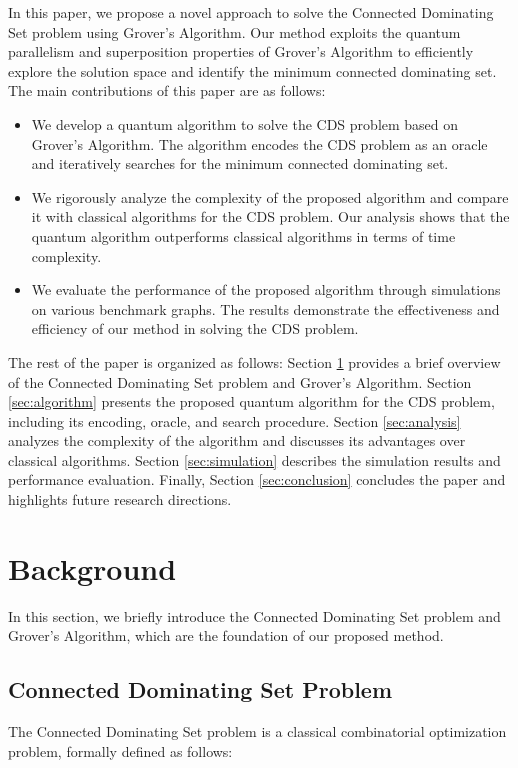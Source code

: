 In this paper, we propose a novel approach to solve the Connected Dominating Set problem using Grover's Algorithm. Our method exploits the quantum parallelism and superposition properties of Grover's Algorithm to efficiently explore the solution space and identify the minimum connected dominating set. The main contributions of this paper are as follows:
\begin{itemize}
    \item We develop a quantum algorithm to solve the CDS problem based on Grover's Algorithm. The algorithm encodes the CDS problem as an oracle and iteratively searches for the minimum connected dominating set.
    \item We rigorously analyze the complexity of the proposed algorithm and compare it with classical algorithms for the CDS problem. Our analysis shows that the quantum algorithm outperforms classical algorithms in terms of time complexity.
    \item We evaluate the performance of the proposed algorithm through simulations on various benchmark graphs. The results demonstrate the effectiveness and efficiency of our method in solving the CDS problem.
\end{itemize}

The rest of the paper is organized as follows: Section \ref{sec:background} provides a brief overview of the Connected Dominating Set problem and Grover's Algorithm. Section \ref{sec:algorithm} presents the proposed quantum algorithm for the CDS problem, including its encoding, oracle, and search procedure. Section \ref{sec:analysis} analyzes the complexity of the algorithm and discusses its advantages over classical algorithms. Section \ref{sec:simulation} describes the simulation results and performance evaluation. Finally, Section \ref{sec:conclusion} concludes the paper and highlights future research directions.

\section{Background}\label{sec:background}
In this section, we briefly introduce the Connected Dominating Set problem and Grover's Algorithm, which are the foundation of our proposed method.

\subsection{Connected Dominating Set Problem}
The Connected Dominating Set problem is a classical combinatorial optimization problem, formally defined as follows:

